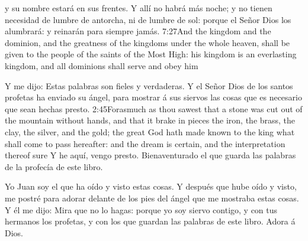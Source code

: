  y su nombre estará en sus frentes. 
Y allí no habrá más noche; y no tienen necesidad de lumbre de antorcha, ni de lumbre de sol: porque el Señor Dios los alumbrará:%
 y reinarán para siempre jamás.%
					{7:27}{And the kingdom and the dominion, and the greatness of the kingdoms under the whole heaven, shall be given to the people of the saints of the Most High: his kingdom is an everlasting kingdom, and all dominions shall serve and obey him} %

Y me dijo: Estas palabras son fieles y verdaderas. Y el Señor Dios de los santos profetas ha enviado su ángel, para mostrar á sus siervos las cosas que es necesario que sean hechas presto.%
			{2:45}{Forasmuch as thou sawest that a stone was cut out of the mountain without hands, and that it brake in pieces the iron, the brass, the clay, the silver, and the gold; the great God hath made known to the king what shall come to pass hereafter: and the dream is certain, and the interpretation thereof sure}
Y he aquí, vengo presto.%
 Bienaventurado el que guarda las palabras de la profecía de este libro.

Yo Juan soy el que ha oído y visto estas cosas. Y después que hube oído y visto, me postré para adorar delante de los pies del ángel que me mostraba estas cosas. 
Y él me dijo: Mira que no lo hagas: porque yo soy siervo contigo, y con tus hermanos los profetas, y con los que guardan las palabras de este libro. Adora á Dios.

